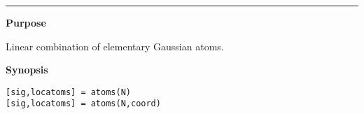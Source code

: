 


\hspace*{-1.6cm}{\Large \bf atoms}

\vspace*{-.4cm}
\hspace*{-1.6cm}\rule[0in]{16.5cm}{.02cm}
\vspace*{.2cm}



{\bf \large {}\selectfont Purpose}\\
\hspace*{1.5cm}
\begin{minipage}[t]{13.5cm}
Linear combination of elementary Gaussian atoms.
\end{minipage}
\vspace*{.5cm}

{\bf \large {}\selectfont Synopsis}\\
\hspace*{1.5cm}
\begin{minipage}[t]{13.5cm}
\begin{verbatim}
[sig,locatoms] = atoms(N)
[sig,locatoms] = atoms(N,coord)
\end{verbatim}
\end{minipage}
\vspace*{.5cm}


